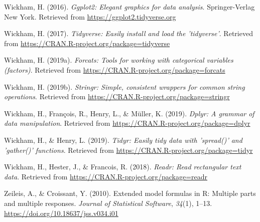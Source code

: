 \documentclass[man]{apa6}
\begin{document}
\leavevmode\hypertarget{ref-R-ggplot2}{}%
Wickham, H. (2016). \emph{Ggplot2: Elegant graphics for data analysis}. Springer-Verlag New York. Retrieved from \url{https://ggplot2.tidyverse.org}

\leavevmode\hypertarget{ref-R-tidyverse}{}%
Wickham, H. (2017). \emph{Tidyverse: Easily install and load the 'tidyverse'}. Retrieved from \url{https://CRAN.R-project.org/package=tidyverse}

\leavevmode\hypertarget{ref-R-forcats}{}%
Wickham, H. (2019a). \emph{Forcats: Tools for working with categorical variables (factors)}. Retrieved from \url{https://CRAN.R-project.org/package=forcats}

\leavevmode\hypertarget{ref-R-stringr}{}%
Wickham, H. (2019b). \emph{Stringr: Simple, consistent wrappers for common string operations}. Retrieved from \url{https://CRAN.R-project.org/package=stringr}

\leavevmode\hypertarget{ref-R-dplyr}{}%
Wickham, H., François, R., Henry, L., \& Müller, K. (2019). \emph{Dplyr: A grammar of data manipulation}. Retrieved from \url{https://CRAN.R-project.org/package=dplyr}

\leavevmode\hypertarget{ref-R-tidyr}{}%
Wickham, H., \& Henry, L. (2019). \emph{Tidyr: Easily tidy data with 'spread()' and 'gather()' functions}. Retrieved from \url{https://CRAN.R-project.org/package=tidyr}

\leavevmode\hypertarget{ref-R-readr}{}%
Wickham, H., Hester, J., \& Francois, R. (2018). \emph{Readr: Read rectangular text data}. Retrieved from \url{https://CRAN.R-project.org/package=readr}

\leavevmode\hypertarget{ref-R-Formula}{}%
Zeileis, A., \& Croissant, Y. (2010). Extended model formulas in R: Multiple parts and multiple responses. \emph{Journal of Statistical Software}, \emph{34}(1), 1--13. \url{https://doi.org/10.18637/jss.v034.i01}

\endgroup
\end{document}
